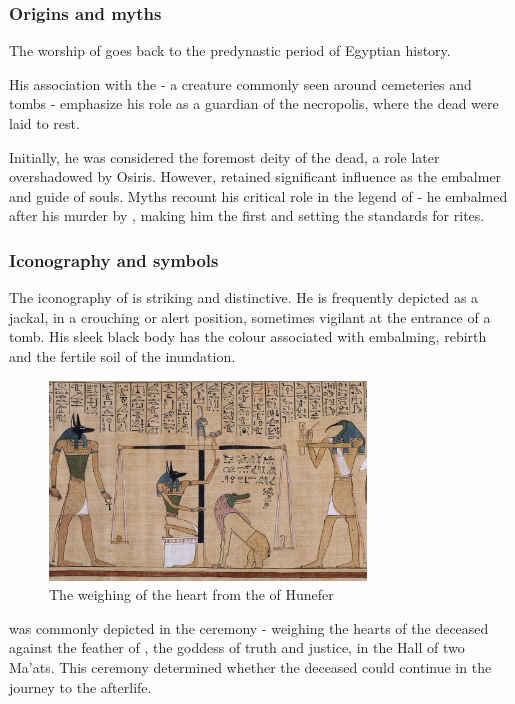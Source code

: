 \subsubsection*{Origins and myths}
The worship of  goes back to the predynastic period of Egyptian history.

His association with the  - a creature commonly seen around cemeteries and tombs - emphasize his role as a guardian of the necropolis, where the dead were laid to rest.

Initially, he was considered the foremost deity of the dead, a role later overshadowed by Osiris. However,  retained significant influence as the embalmer and guide of souls. Myths recount his critical role in the legend of  - he embalmed  after his murder by , making him the first  and setting the standards for  rites.

\subsubsection*{Iconography and symbols}
The iconography of  is striking and distinctive. He is frequently depicted as a jackal, in a crouching or alert position, sometimes vigilant at the entrance of a tomb. His sleek black body has the colour associated with embalming, rebirth and the fertile soil of the  inundation.

\begin{figure} [H]
	\centering
	\includegraphics[width=0.75\textwidth]{../photos/Anubis_Hunefer}
	\caption{The weighing of the heart from the  of Hunefer}
\end{figure}

 was commonly depicted in the  ceremony - weighing the hearts of the deceased against the feather of , the goddess of truth and justice, in the Hall of two Ma'ats. This ceremony determined whether the deceased could continue in the journey to the afterlife.

